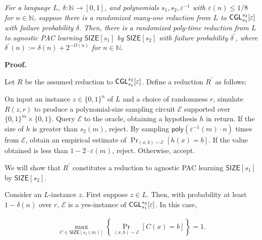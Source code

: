 \documentclass[10pt,a4paper]{article}
\begin{document}
\emph{For a language $L$, $\delta:\mathbb{N}\to[0,1]$, and polynomials $s_{1},s_{2},\varepsilon^{-1}$ with $\varepsilon(n)\leq 1/8$ for $n\in\mathbb{N}$, suppose there is a randomized many-one reduction from $L$ to ${\sf CGL}_{s_{1}}^{s_{2}}[\varepsilon]$ with failure probability $\delta$. Then, there is a randomized poly-time reduction from $L$ to agnostic PAC learning ${\mathsf{SIZE}}[s_{1}]$ by ${\mathsf{SIZE}}[s_{2}]$ with failure probability $\delta^{\prime}$, where $\delta^{\prime}(n):=\delta(n)+2^{-\Omega(n)}$ for $n\in\mathbb{N}$.}\par






\par\medskip\noindent\textbf{Proof.}\par




Let $R$ be the assumed reduction to ${\sf CGL}_{s_{1}}^{s_{2}}[\varepsilon]$. Define a reduction $R^{\prime}$ as follows:\par



On input an instance $z\in\{0,1\}^{n}$ of $L$ and a choice of randomness $r$, simulate $R(z,r)$ to produce a polynomial-size sampling circuit $\mathcal{E}$ supported over $\{0,1\}^{m}\times\{0,1\}$. Query $\mathcal{E}$ to the oracle, obtaining a hypothesis $h$ in return. If the size of $h$ is greater than $s_{2}(m)$, reject. By sampling ${\mathsf{poly}}(\varepsilon^{-1}(m)\cdot n)$ times from $\mathcal{E}$, obtain an empirical estimate of $\Pr_{(x,b)\sim\mathcal{E}}[h(x)=b]$. If the value obtained is less than $1-2\cdot\varepsilon(m)$, reject. Otherwise, accept.\par



We will show that $R^{\prime}$ constitutes a reduction to agnostic PAC learning ${\mathsf{SIZE}}[s_{1}]$ by ${\mathsf{SIZE}}[s_{2}]$.\par




Consider an $L$-instance $z$. First suppose $z\in L$. Then, with probability at least $1-\delta(n)$ over $r$, $\mathcal{E}$ is a yes-instance of ${\sf CGL}_{s_{1}}^{s_{2}}[\varepsilon]$. In this case,\par


\[\begin{gathered}
\max_{C\in{\mathsf{SIZE}}[s_{1}(m)]}\left\{\Pr_{(x,b)\sim\mathcal{E}}[C(x)=b]\right\}=1.
\end{gathered}\]
\end{document}
